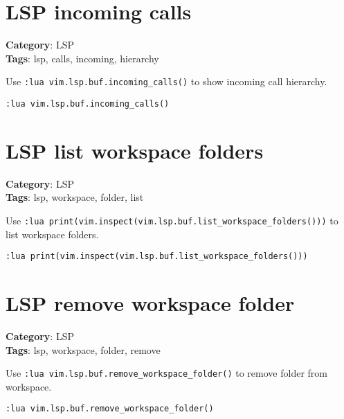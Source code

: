 {{{{{\section{LSP incoming calls}

\textbf{Category}: LSP\\ \textbf{Tags}: lsp, calls, incoming, hierarchy
\vspace{0.5cm}

Use {\footnotesize \Verb§:lua vim.lsp.buf.incoming_calls()§} to show incoming call hierarchy.

\begin{Exa*}{}
\begin{Verbatim}[fontsize=\footnotesize, breaklines, breakanywhere]
:lua vim.lsp.buf.incoming_calls()
\end{Verbatim}
\end{Exa*}

\section{LSP list workspace folders}

\textbf{Category}: LSP\\ \textbf{Tags}: lsp, workspace, folder, list
\vspace{0.5cm}

Use {\footnotesize \Verb§:lua print(vim.inspect(vim.lsp.buf.list_workspace_folders()))§} to list workspace folders.

\begin{Exa*}{}
\begin{Verbatim}[fontsize=\footnotesize, breaklines, breakanywhere]
:lua print(vim.inspect(vim.lsp.buf.list_workspace_folders()))
\end{Verbatim}
\end{Exa*}

\section{LSP remove workspace folder}

\textbf{Category}: LSP\\ \textbf{Tags}: lsp, workspace, folder, remove
\vspace{0.5cm}

Use {\footnotesize \Verb§:lua vim.lsp.buf.remove_workspace_folder()§} to remove folder from workspace.

\begin{Exa*}{}
\begin{Verbatim}[fontsize=\footnotesize, breaklines, breakanywhere]
:lua vim.lsp.buf.remove_workspace_folder()
\end{Verbatim}
\end{Exa*}

}}}}}
